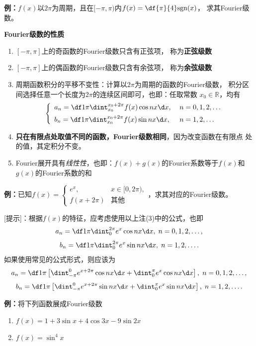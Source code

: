 {\bf 例：}$f(x)$以$2\pi$为周期，且在$[-\pi,\pi)$内$f(x)=\df{\pi}{4}\mathrm{sgn}(x)$，
求其Fourier级数。

\begin{thx}
	{\bf Fourier级数的性质}
	\begin{enumerate}%
	  \item $[-\pi,\pi]$上的奇函数的Fourier级数只含有正弦项， 称为{\bf 正弦级数}
	  \item $[-\pi,\pi]$上的偶函数的Fourier级数只含有余弦项， 称为{\bf 余弦级数}
	  \item {\kaishu 周期函数积分的平移不变性：}计算以$2\pi$为周期的函数的Fourier级数，
	  积分区间选择任意一个长度为$2\pi$的连续区间即可，也即：任取常数
	  $x_0\in\mathbb{R}$，均有
	  	$$\left\{\begin{array}{ll}
			a_n=\df1{\pi}\dint_{x_0}^{x_0+2\pi}f(x)\cos nx\d x,\;& n=0,1,2,\ldots\\[5pt]
			b_n=\df1{\pi}\dint_{x_0}^{x_0+2\pi}f(x)\sin nx\d x,\;& n=1,2,\ldots
	  	\end{array}\right.$$
	  \item {\bf 只在有限点处取值不同的函数，Fourier级数相同}，因为改变函数在有限点
	  处的值，其定积分不变。
	  \item Fourier展开具有{\it 线性性}，也即：$f(x)+g(x)$的Fourier系数等于$f(x)$和
	  $g(x)$的Fourier系数的和
	\end{enumerate}
\end{thx}

{\bf 例：}已知$f(x)=\left\{\begin{array}{ll}
	e^x,& x\in[0,2\pi),\\ f(x+2\pi)& \mbox{其他}
\end{array}\right.$，求其对应的Fourier级数。

[提示]：根据$f(x)$的特征，应考虑使用以上注(3)中的公式，也即
$$a_n=\df1{\pi}\dint_{0}^{2\pi}e^x\cos nx\d x,\; n=0,1,2,\ldots,$$
$$b_n=\df1{\pi}\dint_{0}^{2\pi}e^x\sin nx\d x,\; n=1,2,\ldots.$$
如果使用常见的公式形式，则应该为
$$a_n=\df1{\pi}\left[\dint_{-\pi}^{0}e^{x+2\pi}\cos nx\d x+
\dint_{0}^{\pi}e^x\cos nx\d x\right],\; n=0,1,2,\ldots,$$
$$b_n=\df1{\pi}\left[\dint_{-\pi}^{0}e^{x+2\pi}\sin nx\d x+
\dint_{0}^{\pi}e^x\sin nx\d x\right],\; n=1,2,\ldots.$$

{\bf 例：}将下列函数展成Fourier级数
\begin{enumerate}[(1)]
  \setlength{\itemindent}{1cm}
  \item $f(x)=1+3\sin x+4\cos 3x-9\sin 2x$
  \item $f(x)=\sin^4x$
\end{enumerate}

